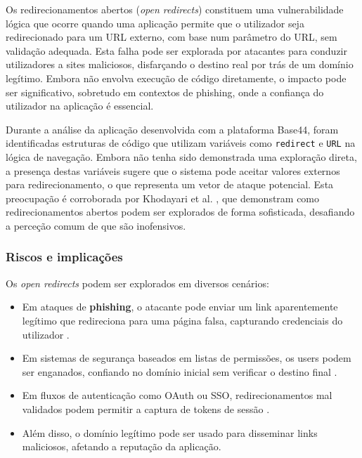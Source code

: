 Os redirecionamentos abertos (\textit{open redirects}) constituem uma vulnerabilidade lógica que ocorre quando uma aplicação permite que o utilizador seja redirecionado para um URL externo, com base num parâmetro do URL, sem validação adequada. Esta falha pode ser explorada por atacantes para conduzir utilizadores a sites maliciosos, disfarçando o destino real por trás de um domínio legítimo. Embora não envolva execução de código diretamente, o impacto pode ser significativo, sobretudo em contextos de phishing, onde a confiança do utilizador na aplicação é essencial.

Durante a análise da aplicação desenvolvida com a plataforma Base44, foram identificadas estruturas de código que utilizam variáveis como \texttt{redirect} e \texttt{URL} na lógica de navegação. Embora não tenha sido demonstrada uma exploração direta, a presença destas variáveis sugere que o sistema pode aceitar valores externos para redirecionamento, o que representa um vetor de ataque potencial. Esta preocupação é corroborada por Khodayari et al. \cite{ref34}, que demonstram como redirecionamentos abertos podem ser explorados de forma sofisticada, desafiando a perceção comum de que são inofensivos.

\subsubsection{Riscos e implicações}
\label{subsubsec:riscos-implicacoes-open-redirects}

Os \textit{open redirects} podem ser explorados em diversos cenários:

\begin{itemize}
    \item Em ataques de \textbf{phishing}, o atacante pode enviar um link aparentemente legítimo que redireciona para uma página falsa, capturando credenciais do utilizador \cite{ref35}.
    
    \item Em sistemas de segurança baseados em listas de permissões, os users podem ser enganados, confiando no domínio inicial sem verificar o destino final \cite{ref34}.
    
    \item Em fluxos de autenticação como OAuth ou SSO, redirecionamentos mal validados podem permitir a captura de tokens de sessão \cite{ref36}.
    
    \item Além disso, o domínio legítimo pode ser usado para disseminar links maliciosos, afetando a reputação da aplicação.
\end{itemize}

